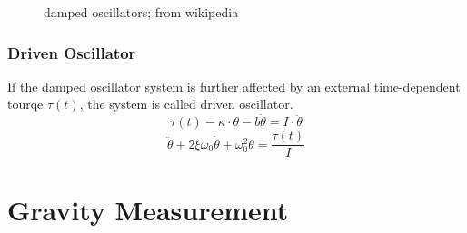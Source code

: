 \documentclass[\main/master.tex]{subfiles}
\begin{document}
\begin{figure}[htbp]
	\centering
	\caption[damped]{damped oscillators; from wikipedia}
	\label{fig:damped_oscillators}
\end{figure}





\iffalse
https://ocw.mit.edu/courses/mathematics/18-03sc-differential-equations-fall-2011/unit-ii-second-order-constant-coefficient-linear-equations/damped-harmonic-oscillators/MIT18_03SCF11_s13_2text.pdf

https://www.sciencedirect.com/topics/engineering/underdamped-system#:~:text=When%
\fi

\subsubsection{Driven Oscillator}
If the damped oscillator system is further affected by an external time-dependent tourqe $\tau(t)$,  the system is called driven oscillator.
\begin{equation}
\tau(t) -\kappa\cdot\theta - b\dot{\theta}  = I\cdot\ddot{\theta}   \label{eqn:driven_motion_equation}
\end{equation} 
\begin{equation}
\ddot{\theta} + 2\xi\omega_0\dot{\theta} + \omega_0^2\theta = \frac{\tau(t)}{I}   \label{eqn:damped_motion_equation}
\end{equation}






\section{Gravity Measurement}
\end{document}
